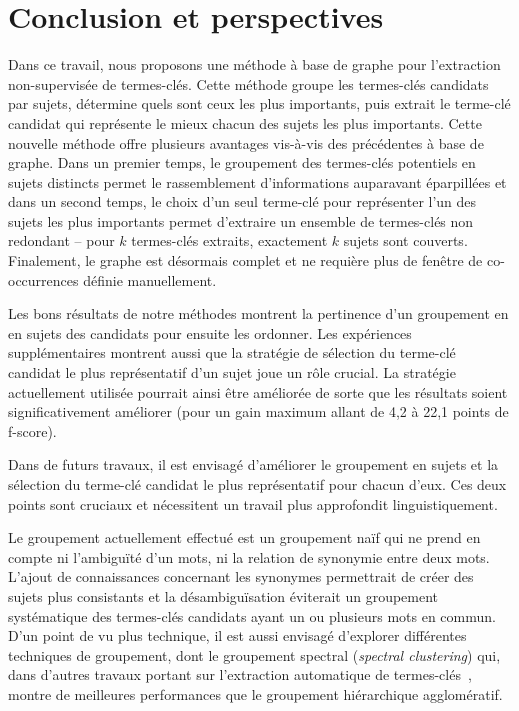 \section{Conclusion et perspectives}
\label{sec:conclusion_et_perspectives}
  Dans ce travail, nous proposons une méthode à base de graphe pour
  l'extraction non-supervisée de termes-clés. Cette méthode groupe les
  termes-clés candidats par sujets, détermine quels sont ceux les plus
  importants, puis extrait le terme-clé candidat qui représente le mieux chacun
  des sujets les plus importants. Cette nouvelle méthode offre plusieurs
  avantages vis-à-vis des précédentes à base de graphe. Dans un premier temps,
  le groupement des termes-clés potentiels en sujets distincts permet le
  rassemblement  d'informations auparavant éparpillées et dans un second temps,
  le choix d'un seul terme-clé pour représenter l'un des sujets les plus
  importants permet d'extraire un ensemble de termes-clés non redondant -- pour
  $k$ termes-clés extraits, exactement $k$ sujets sont couverts. Finalement, le
  graphe est désormais complet et ne requière plus de fenêtre de co-occurrences
  définie manuellement.

  Les bons résultats de notre méthodes montrent la pertinence d'un groupement en
  en sujets des candidats pour ensuite les ordonner. Les expériences
  supplémentaires montrent aussi que la stratégie de sélection du terme-clé
  candidat le plus représentatif d'un sujet joue un rôle crucial. La stratégie
  actuellement utilisée pourrait ainsi être améliorée de sorte que les résultats
  soient significativement améliorer (pour un gain maximum allant de 4,2 à 22,1
  points de f-score).

  Dans de futurs travaux, il est envisagé d'améliorer le groupement en sujets et
  la sélection du terme-clé candidat le plus représentatif pour chacun d'eux.
  Ces deux points sont cruciaux et nécessitent un travail plus approfondit
  linguistiquement.
  
  Le groupement actuellement effectué est un groupement naïf qui ne prend en
  compte ni l'ambiguïté d'un mots, ni la relation de synonymie entre deux mots.
  L'ajout de connaissances concernant les synonymes permettrait de créer des
  sujets plus consistants et la désambiguïsation éviterait un groupement
  systématique des termes-clés candidats ayant un ou plusieurs mots en commun.
  D'un point de vu plus technique, il est aussi envisagé d'explorer différentes
  techniques de groupement, dont le groupement spectral (\textit{spectral
  clustering}) qui, dans d'autres travaux portant sur l'extraction
  automatique de termes-clés~\cite{liu2009keycluster}, montre de meilleures
  performances que le groupement hiérarchique agglomératif.

